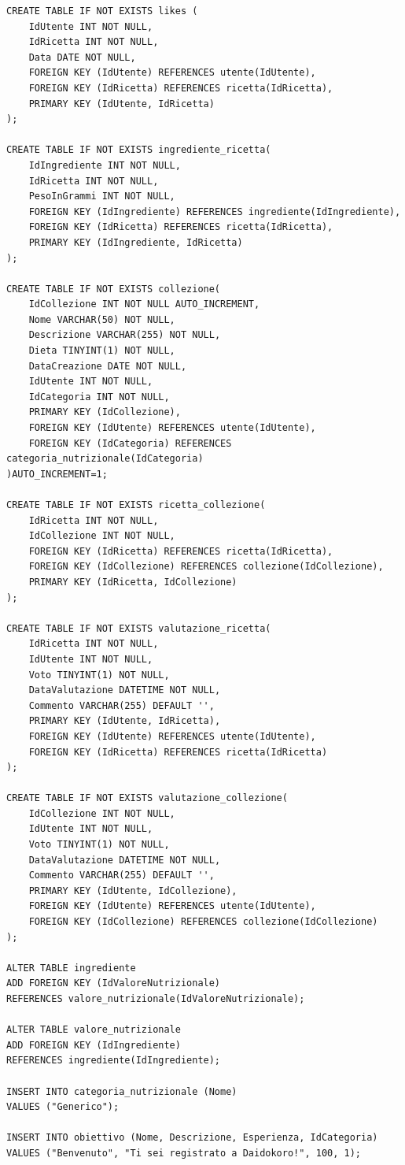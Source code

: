 ﻿\documentclass[a4paper,12pt]{report}
\begin{document}
\begin{verbatim}
CREATE TABLE IF NOT EXISTS likes (
	IdUtente INT NOT NULL,
	IdRicetta INT NOT NULL,
	Data DATE NOT NULL,
	FOREIGN KEY (IdUtente) REFERENCES utente(IdUtente),
	FOREIGN KEY (IdRicetta) REFERENCES ricetta(IdRicetta),
	PRIMARY KEY (IdUtente, IdRicetta)
);

CREATE TABLE IF NOT EXISTS ingrediente_ricetta(
    IdIngrediente INT NOT NULL,
    IdRicetta INT NOT NULL,
    PesoInGrammi INT NOT NULL,
    FOREIGN KEY (IdIngrediente) REFERENCES ingrediente(IdIngrediente),
    FOREIGN KEY (IdRicetta) REFERENCES ricetta(IdRicetta),
    PRIMARY KEY (IdIngrediente, IdRicetta)
);

CREATE TABLE IF NOT EXISTS collezione(
    IdCollezione INT NOT NULL AUTO_INCREMENT,
    Nome VARCHAR(50) NOT NULL,
    Descrizione VARCHAR(255) NOT NULL,
    Dieta TINYINT(1) NOT NULL,
    DataCreazione DATE NOT NULL,
    IdUtente INT NOT NULL,
    IdCategoria INT NOT NULL,
    PRIMARY KEY (IdCollezione),
    FOREIGN KEY (IdUtente) REFERENCES utente(IdUtente),
    FOREIGN KEY (IdCategoria) REFERENCES categoria_nutrizionale(IdCategoria)
)AUTO_INCREMENT=1;

CREATE TABLE IF NOT EXISTS ricetta_collezione(
    IdRicetta INT NOT NULL,
    IdCollezione INT NOT NULL,
    FOREIGN KEY (IdRicetta) REFERENCES ricetta(IdRicetta),
    FOREIGN KEY (IdCollezione) REFERENCES collezione(IdCollezione),
    PRIMARY KEY (IdRicetta, IdCollezione)
);

CREATE TABLE IF NOT EXISTS valutazione_ricetta(
    IdRicetta INT NOT NULL,
    IdUtente INT NOT NULL,
    Voto TINYINT(1) NOT NULL,
    DataValutazione DATETIME NOT NULL,
    Commento VARCHAR(255) DEFAULT '',
    PRIMARY KEY (IdUtente, IdRicetta),
    FOREIGN KEY (IdUtente) REFERENCES utente(IdUtente),
    FOREIGN KEY (IdRicetta) REFERENCES ricetta(IdRicetta)
);

CREATE TABLE IF NOT EXISTS valutazione_collezione(
    IdCollezione INT NOT NULL,
    IdUtente INT NOT NULL,
    Voto TINYINT(1) NOT NULL,
    DataValutazione DATETIME NOT NULL,
    Commento VARCHAR(255) DEFAULT '',
    PRIMARY KEY (IdUtente, IdCollezione),
    FOREIGN KEY (IdUtente) REFERENCES utente(IdUtente),
    FOREIGN KEY (IdCollezione) REFERENCES collezione(IdCollezione)
);

ALTER TABLE ingrediente
ADD FOREIGN KEY (IdValoreNutrizionale)
REFERENCES valore_nutrizionale(IdValoreNutrizionale);

ALTER TABLE valore_nutrizionale
ADD FOREIGN KEY (IdIngrediente)
REFERENCES ingrediente(IdIngrediente);

INSERT INTO categoria_nutrizionale (Nome)
VALUES ("Generico");

INSERT INTO obiettivo (Nome, Descrizione, Esperienza, IdCategoria)
VALUES ("Benvenuto", "Ti sei registrato a Daidokoro!", 100, 1);
\end{verbatim}
\end{document}
